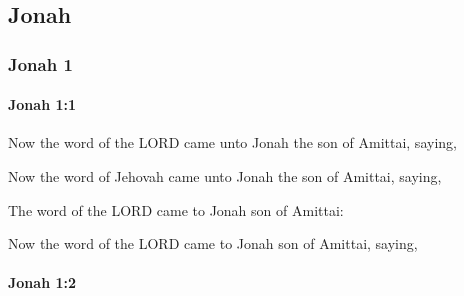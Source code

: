 \subsection{Jonah}
	\label{JONAH}

	\subsubsection{Jonah 1} %
		\label{JONAH-1}

		\paragraph{Jonah 1:1} %
			\label{JONAH-1-1}

			Now the word of the LORD came unto Jonah the son of Amittai, saying,

			\begin{versebox}
					\item[BHS] 
					\item[LXX] 
					\item[ASV] Now the word of Jehovah came unto Jonah the son of Amittai, saying,
					\item[NIV] The word of the LORD came to Jonah son of Amittai:
					\item[NRSV] Now the word of the LORD came to Jonah son of Amittai, saying,
			\end{versebox}

		\paragraph{Jonah 1:2} %
			\label{JONAH-1-2}

